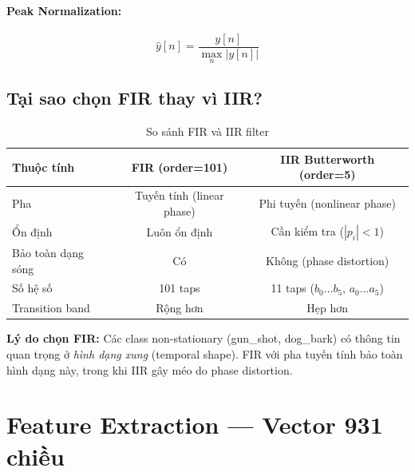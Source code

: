 \documentclass[12pt,a4paper]{article}
\begin{document}
\paragraph{Peak Normalization:}
\begin{equation}
    \hat{y}[n] = \frac{y[n]}{\displaystyle\max_{n} |y[n]|}
\end{equation}

\subsection{Tại sao chọn FIR thay vì IIR?}

\begin{table}[H]
\centering
\caption{So sánh FIR và IIR filter}
\label{tab:fir-vs-iir}
\begin{tabular}{@{}lcc@{}}
\toprule
\textbf{Thuộc tính} & \textbf{FIR (order=101)} & \textbf{IIR Butterworth (order=5)} \\
\midrule
Pha              & Tuyến tính (linear phase)      & Phi tuyến (nonlinear phase) \\
Ổn định          & Luôn ổn định                    & Cần kiểm tra ($|p_i| < 1$) \\
Bảo toàn dạng sóng & Có                           & Không (phase distortion) \\
Số hệ số         & 101 taps                        & 11 taps ($b_0\ldots b_5$, $a_0\ldots a_5$) \\
Transition band  & Rộng hơn                        & Hẹp hơn \\
\bottomrule
\end{tabular}
\end{table}

\textbf{Lý do chọn FIR:} Các class non-stationary (gun\_shot, dog\_bark) có thông tin quan trọng ở \emph{hình dạng xung} (temporal shape). FIR với pha tuyến tính bảo toàn hình dạng này, trong khi IIR gây méo do phase distortion.


\section{Feature Extraction — Vector 931 chiều}
\end{document}

